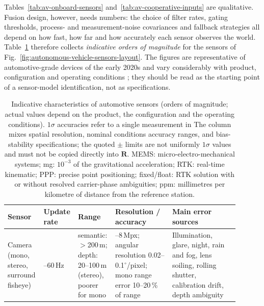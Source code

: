 \documentclass[graybox,envcountchap]{style/SNmono}
\providecommand{\DIFadd}[1]{{\protect\color{blue} #1}} %
\providecommand{\DIFdel}[1]{{\protect\color{red} #1}} %
\providecommand{\DIFaddFL}[1]{\DIFadd{#1}} %
\providecommand{\DIFdelFL}[1]{\DIFdel{#1}} %
\providecommand{\DIFaddbeginFL}{} %
\providecommand{\DIFaddendFL}{} %
\providecommand{\DIFdelbeginFL}{} %
\providecommand{\DIFdelendFL}{} %
\begin{document}
Tables~\ref{tab:av-onboard-sensors} and~\ref{tab:av-cooperative-inputs} are qualitative. Fusion design, however, needs numbers: the choice of filter rates, gating thresholds, process- and measurement-noise covariances and fallback strategies all depend on how fast, how far and how accurately each sensor observes the world. Table~\ref{tab:av-sensor-characteristics} therefore collects \emph{indicative orders of magnitude} for the sensors of Fig.~\ref{fig:autonomous-vehicle-sensors-layout}. The figures are representative of automotive-grade devices of the early 2020s and vary considerably with product, configuration and operating conditions \cite{yeong2021_sensors,patole2017_radar,groves2013_gnss}; they should be read as the starting point of a sensor-model identification, not as specifications.

\begin{table}[!t]
    \centering
    \renewcommand{\arraystretch}{1.25}
    \scriptsize
    \caption{Indicative characteristics of automotive sensors (orders of magnitude; actual values depend on the product, the configuration and the operating conditions). \DIFdelbeginFL \DIFdelFL{$1\sigma$ accuracies refer to a single measurement in }\DIFdelendFL \DIFaddbeginFL \DIFaddFL{The column mixes spatial resolution, }\DIFaddendFL nominal \DIFdelbeginFL \DIFdelFL{conditions}\DIFdelendFL \DIFaddbeginFL \DIFaddFL{accuracy ranges, and bias-stability specifications; the quoted $\pm$ limits are not uniformly $1\sigma$ values and must not be copied directly into $\mathbf{R}$}\DIFaddendFL . MEMS: micro-electro-mechanical systems; mg: $10^{-3}$ of the gravitational acceleration; RTK: real-time kinematic; PPP: precise point positioning; fixed/float: RTK solution with or without resolved carrier-phase ambiguities; ppm: millimetres per kilometre of distance from the reference station.}
    \label{tab:av-sensor-characteristics}
    \begin{tabular}{>{\raggedright\arraybackslash}p{0.15\linewidth} >{\raggedright\arraybackslash}p{0.10\linewidth} >{\raggedright\arraybackslash}p{0.13\linewidth} >{\raggedright\arraybackslash}p{0.24\linewidth} >{\raggedright\arraybackslash}p{0.28\linewidth}}
        \hline
        \textbf{Sensor} & \textbf{Update rate} & \textbf{Range} & \textbf{Resolution / accuracy} & \textbf{Main error sources} \\
        \hline
        Camera (mono, stereo, surround fisheye) & 10--60\,Hz & semantic: $>$200\,m; depth: 20--100\,m (stereo), poorer for mono & 1--8\,Mpx; angular resolution 0.02--0.1$^{\circ}$/pixel; mono range error 10--20\,\% of range & Illumination, glare, night, rain and fog, lens soiling, rolling shutter, calibration drift, depth ambiguity \\

\end{tabular}
\end{table}
\end{document}
